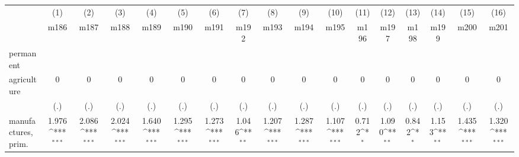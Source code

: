 {
\def\sym#1{\ifmmode^{#1}\else\(^{#1}\)\fi}
\begin{tabular}{l*{16}{c}}
\hline\hline
                    &\multicolumn{1}{c}{(1)}&\multicolumn{1}{c}{(2)}&\multicolumn{1}{c}{(3)}&\multicolumn{1}{c}{(4)}&\multicolumn{1}{c}{(5)}&\multicolumn{1}{c}{(6)}&\multicolumn{1}{c}{(7)}&\multicolumn{1}{c}{(8)}&\multicolumn{1}{c}{(9)}&\multicolumn{1}{c}{(10)}&\multicolumn{1}{c}{(11)}&\multicolumn{1}{c}{(12)}&\multicolumn{1}{c}{(13)}&\multicolumn{1}{c}{(14)}&\multicolumn{1}{c}{(15)}&\multicolumn{1}{c}{(16)}\\
                    &\multicolumn{1}{c}{m186}&\multicolumn{1}{c}{m187}&\multicolumn{1}{c}{m188}&\multicolumn{1}{c}{m189}&\multicolumn{1}{c}{m190}&\multicolumn{1}{c}{m191}&\multicolumn{1}{c}{m192}&\multicolumn{1}{c}{m193}&\multicolumn{1}{c}{m194}&\multicolumn{1}{c}{m195}&\multicolumn{1}{c}{m196}&\multicolumn{1}{c}{m197}&\multicolumn{1}{c}{m198}&\multicolumn{1}{c}{m199}&\multicolumn{1}{c}{m200}&\multicolumn{1}{c}{m201}\\
\hline
permanent           &                     &                     &                     &                     &                     &                     &                     &                     &                     &                     &                     &                     &                     &                     &                     &                     \\
agriculture         &           0         &           0         &           0         &           0         &           0         &           0         &           0         &           0         &           0         &           0         &           0         &           0         &           0         &           0         &           0         &           0         \\
                    &         (.)         &         (.)         &         (.)         &         (.)         &         (.)         &         (.)         &         (.)         &         (.)         &         (.)         &         (.)         &         (.)         &         (.)         &         (.)         &         (.)         &         (.)         &         (.)         \\
[1em]
manufactures, prim. &       1.976\sym{***}&       2.086\sym{***}&       2.024\sym{***}&       1.640\sym{***}&       1.295\sym{***}&       1.273\sym{***}&       1.046\sym{**} &       1.207\sym{***}&       1.287\sym{***}&       1.107\sym{***}&       0.712\sym{*}  &       1.090\sym{**} &       0.842\sym{*}  &       1.153\sym{**} &       1.435\sym{***}&       1.320\sym{***}\\

\end{tabular}}
